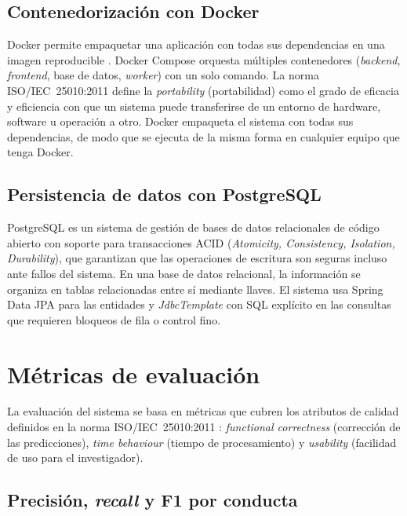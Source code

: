 \subsection{Contenedorización con Docker}

Docker permite empaquetar una aplicación con todas sus dependencias en una imagen
reproducible \cite{merkel2014}. Docker Compose orquesta múltiples contenedores
(\textit{backend}, \textit{frontend}, base de datos, \textit{worker}) con un solo comando. La norma
ISO/IEC~25010:2011 \cite{iso25010} define la \textit{portability} (portabilidad) como el
grado de eficacia y eficiencia con que un sistema puede transferirse de un entorno de
hardware, software u operación a otro. Docker empaqueta el sistema con todas sus dependencias, de modo que se ejecuta de la misma forma en cualquier equipo que tenga Docker.

\subsection{Persistencia de datos con PostgreSQL}

PostgreSQL es un sistema de gestión de bases de datos relacionales de código abierto
con soporte para transacciones ACID (\textit{Atomicity, Consistency, Isolation,
Durability}), que garantizan que las operaciones de escritura son seguras incluso ante
fallos del sistema. En una base de datos relacional, la información se organiza en tablas
relacionadas entre sí mediante llaves. El sistema usa Spring Data JPA para las entidades y \textit{JdbcTemplate} con SQL explícito en las consultas que requieren bloqueos de fila o control fino.

\section{Métricas de evaluación}

La evaluación del sistema se basa en métricas que cubren los atributos de calidad
definidos en la norma ISO/IEC~25010:2011 \cite{iso25010}: \textit{functional
correctness} (corrección de las predicciones), \textit{time behaviour} (tiempo de
procesamiento) y \textit{usability} (facilidad de uso para el investigador).

\subsection{Precisión, \textit{recall} y F1 por conducta}

